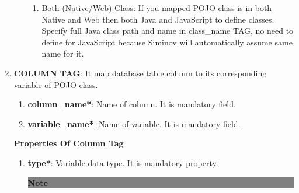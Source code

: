 \begin{enumerate}
\begin{enumerate}
\begin{center}
{{\begin{enumerate}
					\item \small Both (Native/Web) Class: If you mapped POJO class is in both Native and Web then both Java and JavaScript to define classes. Specify full Java class path and name in class\_name TAG, no need to define for JavaScript because Siminov will automatically assume same name for it.

	
				\end{enumerate}

				\vspace*{0.0cm} %
			}
		}

	\end{center}
			
		\end{enumerate}


	\item \small \textbf{COLUMN TAG}: It map database table column to its corresponding variable of POJO class.

		\begin{enumerate}

			\item \small \textbf{column\_name*}: Name of column. It is mandatory field.
			\item \small \textbf{variable\_name*}: Name of variable. It is mandatory field.

		\end{enumerate}

		
		\par
		\textbf{Properties Of Column Tag}
	
		\begin{enumerate}

			\item \small \textbf{type*}: Variable data type. It is mandatory property. 


	\begin{center}
		\colorbox{grey}{
			\parbox[t]{.8\linewidth}{
				\fontsize{11pt}{11pt}\selectfont %
				\vspace*{0.1cm} %
		
				\hfill \textbf{Note} \\

				\hfill 

				\begin{enumerate}
		

\end{enumerate}}}
\end{center}
\end{enumerate}
\end{enumerate}
